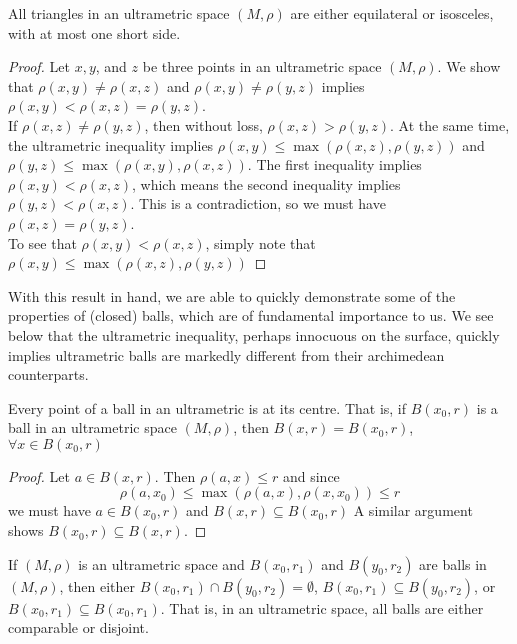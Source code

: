 \begin{proposition}
	 All triangles in an ultrametric space $(M,\rho)$ are either equilateral or isosceles, with at most one short side. 
\end{proposition}

\begin{proof}
Let $x,y$, and $z$ be three points in an ultrametric space $(M,\rho)$. We show that $\rho(x,y) \neq \rho(x,z)$ and $\rho(x,y) \neq \rho(y,z)$ implies $\rho(x,y) < \rho(x,z) = \rho(y,z)$.\\

If $\rho(x,z) \neq \rho(y,z)$, then without loss, $\rho(x,z) > \rho(y,z)$. At the same time, the ultrametric inequality implies $\rho(x,y) \leq \max(\rho(x,z), \rho(y,z))$ and  $\rho(y,z) \leq \max(\rho(x,y), \rho(x,z))$. The first inequality implies $\rho(x,y) < \rho(x,z)$, which means the second inequality implies $\rho(y,z) < \rho(x,z)$. This is a contradiction, so we must have $\rho(x,z) = \rho(y,z)$.\\

To see that $\rho(x,y) < \rho(x,z)$, simply note that $\rho(x,y) \leq \max(\rho(x,z), \rho(y,z))$
\end{proof}

With this result in hand, we are able to quickly demonstrate some of the properties of (closed) balls, which are of fundamental importance to us. We see below that the ultrametric inequality, perhaps innocuous on the surface, quickly implies ultrametric balls are markedly different from their archimedean counterparts.\\

\begin{proposition}
 Every point of a ball in an ultrametric is at its centre. That is, if $B(x_0, r)$ is a ball in an ultrametric space $(M,\rho)$, then $B(x, r)=B(x_0, r)$,  $\forall x \in B(x_0, r)$
\end{proposition}

\begin{proof}
Let $a \in B(x, r)$. Then $\rho(a,x) \leq r$ and since \[\rho(a,x_0) \leq \max(\rho(a,x), \rho(x,x_0)) \leq r\] we must have $a \in B(x_0, r)$ and  $B(x, r) \subseteq B(x_0, r)$ A similar argument shows $B(x_0, r) \subseteq B(x, r)$.
\end{proof}

\begin{proposition}
	If $(M, \rho)$ is an ultrametric space and $B(x_0, r_1)$ and $B(y_0, r_2)$ are balls in $(M, \rho)$, then either $B(x_0, r_1) \cap B(y_0, r_2) = \emptyset$, $B(x_0, r_1) \subseteq B(y_0, r_2)$, or $B(x_0, r_1) \subseteq B(x_0, r_1)$. That is, in an ultrametric space, all balls are either comparable or disjoint.
\end{proposition}

